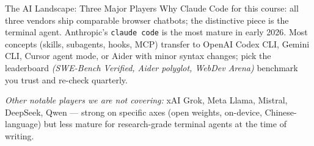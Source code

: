 \documentclass[aspectratio=169,10pt]{beamer}
\newcommand{\emphc}[1]{\textcolor{harvardcrimson}{#1}}
\begin{document}
\begin{frame}{The AI Landscape: Three Major Players}
\vspace{0.2em}
\emphc{Why Claude Code for this course:}
all three vendors ship comparable browser chatbots; the distinctive piece is the
terminal agent. Anthropic's \texttt{claude code} is the most mature in early
2026. Most concepts (skills, subagents, hooks, MCP) transfer to OpenAI Codex
CLI, Gemini CLI, Cursor agent mode, or Aider with minor syntax changes; pick
the leaderboard \emph{(SWE-Bench Verified, Aider polyglot, WebDev Arena)}
benchmark you trust and re-check quarterly.

\vspace{0.2em}
{\tiny \emph{Other notable players we are not covering:}
xAI Grok, Meta Llama, Mistral, DeepSeek, Qwen --- strong on specific axes
(open weights, on-device, Chinese-language) but less mature for
research-grade terminal agents at the time of writing.}
\end{frame}
\end{document}

